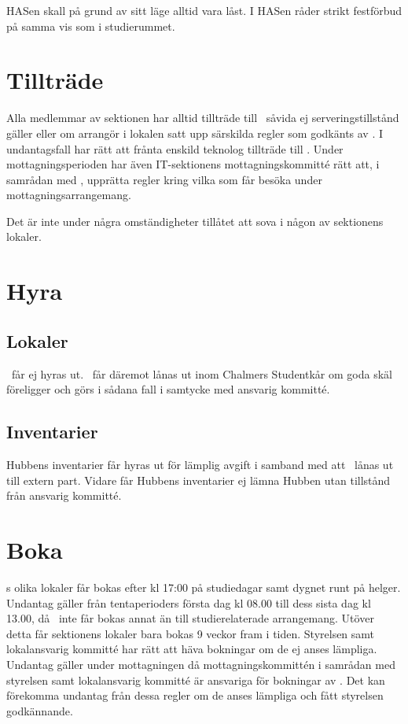 \documentclass[11pt, includeaddress]{classes/cthit}
\begin{document}
HASen skall på grund av sitt läge alltid vara låst. I HASen råder strikt festförbud på samma vis som i studierummet.

\section{Tillträde}
Alla medlemmar av sektionen har alltid tillträde till \HUBBEN\ såvida ej serveringstillstånd gäller eller
om arrangör i lokalen satt upp särskilda regler som godkänts av \STYRIT. I undantagsfall har \STYRIT{} rätt
att frånta enskild teknolog tillträde till \HUBBEN{}. Under mottagningsperioden har även IT-sektionens mottagningskommitté rätt att, i samrådan med \STYRIT{}, upprätta regler kring vilka som får besöka \HUBBEN{} under mottagningsarrangemang.


Det är inte under några omständigheter tillåtet att sova i någon av sektionens lokaler.


\section{Hyra}
\subsection{Lokaler}
\HUBBEN\ får ej hyras ut. \HUBBEN\ får däremot lånas ut inom Chalmers Studentkår om goda skäl
föreligger och görs i sådana fall i samtycke med ansvarig kommitté.

\subsection{Inventarier}
Hubbens inventarier får hyras ut för lämplig avgift i samband med att \HUBBEN\ lånas ut till extern part.
Vidare får Hubbens inventarier ej lämna Hubben utan tillstånd från ansvarig kommitté.


\section{Boka}
\HUBBEN{}s olika lokaler får bokas efter kl 17:00 på studiedagar samt dygnet runt på helger. 
Undantag gäller från tentaperioders första dag kl 08.00 till dess sista dag kl 13.00, då \HUBBEN\ inte får bokas annat än till studierelaterade arrangemang.
Utöver detta får sektionens lokaler bara bokas 9 veckor fram i tiden. 
Styrelsen samt lokalansvarig kommitté har rätt att häva bokningar om de ej anses lämpliga.
Undantag gäller under mottagningen då mottagningskommittén i samrådan med styrelsen samt lokalansvarig kommitté är ansvariga för bokningar av \HUBBEN{}. 
Det kan förekomma undantag från dessa regler om de anses lämpliga och fått styrelsen godkännande.
\end{document}
